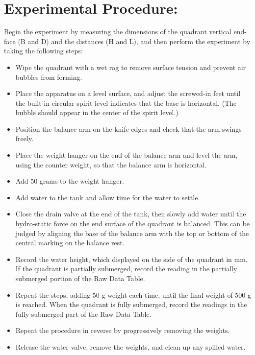 \documentclass[12pt,a4paper]{article}
\begin{document}
\section{Experimental Procedure:}
Begin the experiment by measuring the dimensions of the quadrant vertical end-face (B and D) and the distances (H and L), and then perform the experiment by taking the following steps:
\begin{itemize}
\item Wipe the quadrant with a wet rag to remove surface tension and prevent air bubbles from forming.
\item Place the apparatus on a level surface, and adjust the screwed-in feet until the built-in circular spirit level indicates that the base is horizontal. (The bubble should appear in the center of the spirit level.)
\item Position the balance arm on the knife edges and check that the arm swings freely.
\item Place the weight hanger on the end of the balance arm and level the arm, using the counter weight, so that the balance arm is horizontal.
\item Add 50 grams to the weight hanger.
\item Add water to the tank and allow time for the water to settle.
\item Close the drain valve at the end of the tank, then slowly add water until the hydro-static force on the end surface of the quadrant is balanced. This can be judged by aligning the base of the balance arm with the top or bottom of the central marking on the balance rest.
\item Record the water height, which displayed on the side of the quadrant in mm. If the quadrant is partially submerged, record the reading in the partially submerged portion of the Raw Data Table.
\item Repeat the steps, adding 50 g weight each time, until the final weight of 500 g is reached. When the quadrant is fully submerged, record the readings in the fully submerged part of the Raw Data Table.
\item Repeat the procedure in reverse by progressively removing the weights.
\item Release the water valve, remove the weights, and clean up any spilled water.
\end{itemize}
\end{document}
